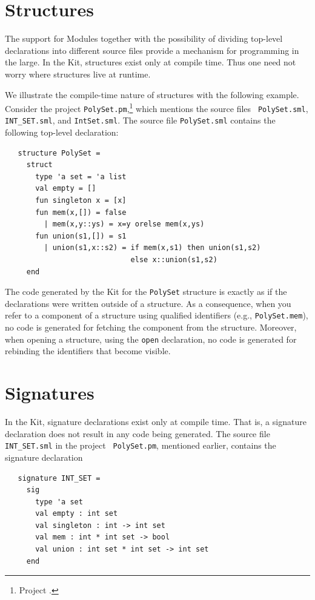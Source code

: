 \documentclass[12pt]{book}
\begin{document}
\section{Structures}
The support for Modules together with the possibility of dividing
top-level declarations into different source files provide a mechanism
for programming in the large. In the Kit, structures exist only at
compile time.  Thus one need not worry where
%
structures live at runtime.

We illustrate the compile-time nature of structures with the following
example. Consider the project {\tt PolySet.pm},\footnote{Project
  .} which mentions the source files {\tt
  PolySet.sml}, {\tt INT\_SET.sml}, and {\tt IntSet.sml}. The source
file {\tt PolySet.sml} contains the following top-level declaration:
\newpage
\begin{verbatim}
   structure PolySet =
     struct
       type 'a set = 'a list
       val empty = []
       fun singleton x = [x]
       fun mem(x,[]) = false
         | mem(x,y::ys) = x=y orelse mem(x,ys)
       fun union(s1,[]) = s1
         | union(s1,x::s2) = if mem(x,s1) then union(s1,s2)
                             else x::union(s1,s2)
     end
\end{verbatim}
The code generated by the Kit for the {\tt PolySet} structure is
exactly as if the declarations were written outside of a structure.
As a consequence, when you refer to a component of a structure using
qualified identifiers (e.g., {\tt PolySet.mem}), no code is generated
for fetching the component from the structure. Moreover, when opening
a structure, using the
%
{\tt open} declaration, no code is generated for rebinding the
identifiers that become visible.

\section{Signatures}
%
In the Kit, signature declarations exist only at compile time. That
is, a signature declaration does not result in any code being
generated. The source file {\tt INT\_SET.sml} in the project {\tt
  PolySet.pm}, mentioned earlier, contains the signature declaration
\begin{verbatim}
   signature INT_SET =
     sig
       type 'a set
       val empty : int set
       val singleton : int -> int set
       val mem : int * int set -> bool
       val union : int set * int set -> int set
     end
\end{verbatim}
\end{document}
